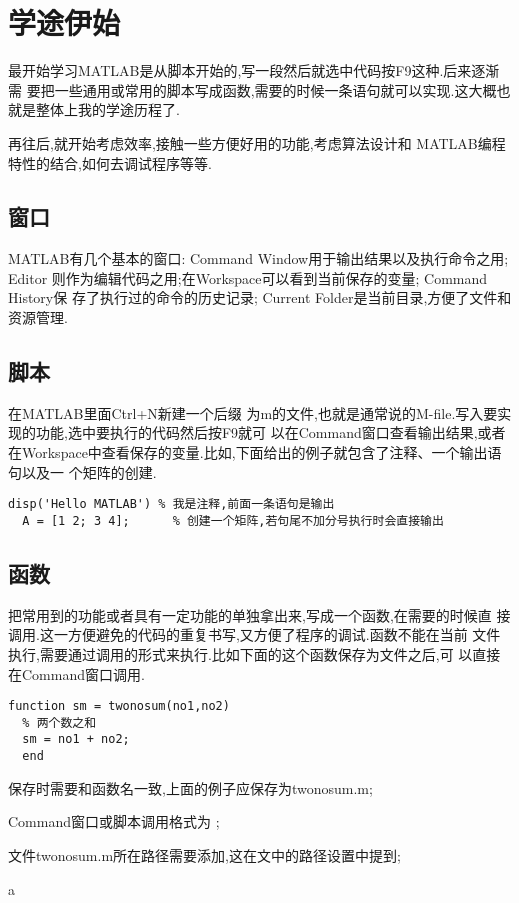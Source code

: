 ﻿\section{学途伊始}
\setcounter{page}{1}
最开始学习MATLAB是从脚本开始的,写一段然后就选中代码按F9这种.后来逐渐需
要把一些通用或常用的脚本写成函数,需要的时候一条语句就可以实现.这大概也
就是整体上我的学途历程了.\par
再往后,就开始考虑效率,接触一些方便好用的功能,考虑算法设计和
MATLAB编程特性的结合,如何去调试程序等等.

\subsection{窗口}
MATLAB有几个基本的窗口: Command Window用于输出结果以及执行命令之用; Editor
则作为编辑代码之用;在Workspace可以看到当前保存的变量; Command History保
存了执行过的命令的历史记录; Current Folder是当前目录,方便了文件和资源管理.

\subsection{脚本}
在MATLAB里面Ctrl+N新建一个后缀
为m的文件,也就是通常说的M-file.写入要实现的功能,选中要执行的代码然后按F9就可
以在Command窗口查看输出结果,或者在Workspace中查看保存的变量.比如,下面给出的例子就包含了注释、一个输出语句以及一
个矩阵的创建.

\vspace{-0.8cm}
\begin{lstlisting}[caption=第一个脚本]
  disp('Hello MATLAB') % 我是注释,前面一条语句是输出
  A = [1 2; 3 4];      % 创建一个矩阵,若句尾不加分号执行时会直接输出
\end{lstlisting}

\subsection{函数}
把常用到的功能或者具有一定功能的单独拿出来,写成一个函数,在需要的时候直
接调用.这一方便避免的代码的重复书写,又方便了程序的调试.函数不能在当前
文件执行,需要通过调用的形式来执行.比如下面的这个函数保存为文件之后,可
以直接在Command窗口调用.

\vspace{-0.8cm}
\begin{lstlisting}[caption = 第一个函数]
  function sm = twonosum(no1,no2)
  % 两个数之和
  sm = no1 + no2;
  end
\end{lstlisting}

\begindot
  \item 保存时需要和函数名一致,上面的例子应保存为twonosum.m;
  \item Command窗口或脚本调用格式为 ;
  \item 文件twonosum.m所在路径需要添加,这在文中的路径设置中提到;
\myenddot

a

